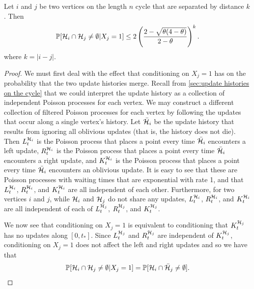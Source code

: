 \begin{lemma}
	\label{lem:A_ij bound conditioned}
		Let $i$ and $j$ be two vertices on the length $n$ cycle that are separated by distance $k$. Then
		\begin{equation}
			\mathbb{P}[\mathcal{H}_i \cap \mathcal{H}_j \neq \emptyset|X_{j} = 1] \leq 2\left(\frac{2 - \sqrt{\theta(4 - \theta)}}{2 - \theta}\right)^k.
		\end{equation}
		where $k = |i - j|$.
	\end{lemma}
	\begin{proof}
		We must first deal with the effect that conditioning on $X_j = 1$ has on the probability that the two update histories merge. Recall from \ref{sec:update histories on the cycle} that we could interpret the update history as a collection of independent Poisson processes for each vertex. We may construct a different collection of filtered Poisson processes for each vertex by following the updates that occur along a single vertex's history. Let $\bar{\mathcal{H}}_i$ be the update history that results from ignoring all oblivious updates (that is, the history does not die). Then $L_t^{\mathcal{H}_i}$ is the Poisson process that places a point every time $\bar{\mathcal{H}}_i$ encounters a left update, $R_t^{\mathcal{H}_i}$ is the Poisson process that places a point every time $\bar{\mathcal{H}}_i$ encounters a right update, and $K_t^{\mathcal{H}_i}$ is the Poisson process that places a point every time $\bar{\mathcal{H}}_i$ encounters an oblivious update. It is easy to see that these are Poisson processes with waiting times that are exponential with rate 1, and that $L_t^{\mathcal{H}_i}$, $R_t^{\mathcal{H}_i}$, and $K_t^{\mathcal{H}_i}$ are all independent of each other. Furthermore, for two vertices $i$ and $j$, while $\mathcal{H}_i$ and $\mathcal{H}_j$ do not share any updates, $L_t^{\mathcal{H}_i}$, $R_t^{\mathcal{H}_i}$, and $K_t^{\mathcal{H}_i}$ are all independent of each of $L_t^{\mathcal{H}_j}$, $R_t^{\mathcal{H}_j}$, and $K_t^{\mathcal{H}_j}$.

		We now see that conditioning on $X_j = 1$ is equivalent to conditioning that $K_t^{\mathcal{H}_j}$ has no updates along $[0, t_*]$. Since $L_t^{\mathcal{H}_j}$ and $R_t^{\mathcal{H}_j}$ are independent of $K_t^{\mathcal{H}_j}$, conditioning on $X_j = 1$ does not affect the left and right updates and so we have that
		\begin{equation}
			\mathbb{P}[\mathcal{H}_i \cap \mathcal{H}_j \neq \emptyset | X_j = 1] = \mathbb{P}[\mathcal{H}_i \cap \bar{\mathcal{H}}_j \neq \emptyset].
		\end{equation}



		

\end{proof}

